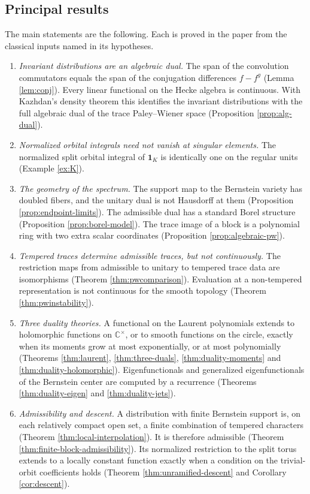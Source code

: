 \documentclass[12pt,letterpaper]{amsart}
\numberwithin{equation}{section}
\theoremstyle{definition}
\theoremstyle{remark}
\begin{document}
\subsection{Principal results}\label{sec:results}
The main statements are the following. Each is proved in the paper from the classical inputs named in its hypotheses.
\begin{enumerate}[label=\arabic*.,leftmargin=*]
\item \emph{Invariant distributions are an algebraic dual.} The span of the convolution commutators equals the span of the conjugation differences $f-f^g$ (Lemma \ref{lem:conj}). Every linear functional on the Hecke algebra is continuous. With Kazhdan's density theorem this identifies the invariant distributions with the full algebraic dual of the trace Paley--Wiener space (Proposition \ref{prop:alg-dual}).
\item \emph{Normalized orbital integrals need not vanish at singular elements.} The normalized split orbital integral of $\mathbf 1_K$ is identically one on the regular units (Example \ref{ex:K}).
\item \emph{The geometry of the spectrum.} The support map to the Bernstein variety has doubled fibers, and the unitary dual is not Hausdorff at them (Proposition \ref{prop:endpoint-limits}). The admissible dual has a standard Borel structure (Proposition \ref{prop:borel-model}). The trace image of a block is a polynomial ring with two extra scalar coordinates (Proposition \ref{prop:algebraic-pw}).
\item \emph{Tempered traces determine admissible traces, but not continuously.} The restriction maps from admissible to unitary to tempered trace data are isomorphisms (Theorem \ref{thm:pwcomparison}). Evaluation at a non-tempered representation is not continuous for the smooth topology (Theorem \ref{thm:pwinstability}).
\item \emph{Three duality theories.} A functional on the Laurent polynomials extends to holomorphic functions on $\mathbb C^\times$, or to smooth functions on the circle, exactly when its moments grow at most exponentially, or at most polynomially (Theorems \ref{thm:laurent}, \ref{thm:three-duals}, \ref{thm:duality-moments} and \ref{thm:duality-holomorphic}). Eigenfunctionals and generalized eigenfunctionals of the Bernstein center are computed by a recurrence (Theorems \ref{thm:duality-eigen} and \ref{thm:duality-jets}).
\item \emph{Admissibility and descent.} A distribution with finite Bernstein support is, on each relatively compact open set, a finite combination of tempered characters (Theorem \ref{thm:local-interpolation}). It is therefore admissible (Theorem \ref{thm:finite-block-admissibility}). Its normalized restriction to the split torus extends to a locally constant function exactly when a condition on the trivial-orbit coefficients holds (Theorem \ref{thm:unramified-descent} and Corollary \ref{cor:descent}).

\end{enumerate}
\end{document}
